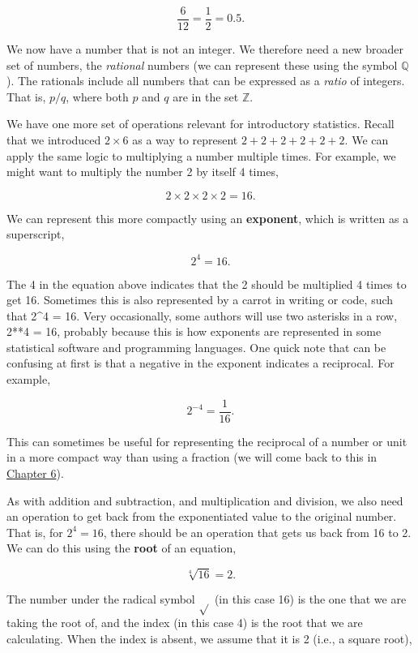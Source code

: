 \documentclass[
  openany]{scrbook}
\begin{document}
\[\frac{6}{12} = \frac{1}{2} = 0.5.\]

We now have a number that is not an integer.
We therefore need a new broader set of numbers, the \emph{rational} numbers (we can represent these using the symbol \(\mathbb{Q}\)).
The rationals include all numbers that can be expressed as a \emph{ratio} of integers.
That is, \(p / q\), where both \(p\) and \(q\) are in the set \(\mathbb{Z}\).

We have one more set of operations relevant for introductory statistics.
Recall that we introduced \(2 \times 6\) as a way to represent \(2 + 2 + 2 + 2 + 2 + 2\).
We can apply the same logic to multiplying a number multiple times.
For example, we might want to multiply the number 2 by itself 4 times,

\[2 \times 2 \times 2 \times 2 = 16.\]

We can represent this more compactly using an \textbf{exponent}, which is written as a superscript,

\[2^{4} = 16.\]

The 4 in the equation above indicates that the 2 should be multiplied 4 times to get 16.
Sometimes this is also represented by a carrot in writing or code, such that 2\^{}4 = 16.
Very occasionally, some authors will use two asterisks in a row, 2**4 = 16, probably because this is how exponents are represented in some statistical software and programming languages.
One quick note that can be confusing at first is that a negative in the exponent indicates a reciprocal.
For example,

\[2^{-4} = \frac{1}{16}.\]

This can sometimes be useful for representing the reciprocal of a number or unit in a more compact way than using a fraction (we will come back to this in \protect\hyperlink{Chapter_6}{Chapter 6}).

As with addition and subtraction, and multiplication and division, we also need an operation to get back from the exponentiated value to the original number.
That is, for \(2^{4} = 16\), there should be an operation that gets us back from 16 to 2.
We can do this using the \textbf{root} of an equation,

\[\sqrt[4]{16} = 2.\]

The number under the radical symbol \(\sqrt{}\) (in this case 16) is the one that we are taking the root of, and the index (in this case 4) is the root that we are calculating.
When the index is absent, we assume that it is 2 (i.e., a square root),
\end{document}
